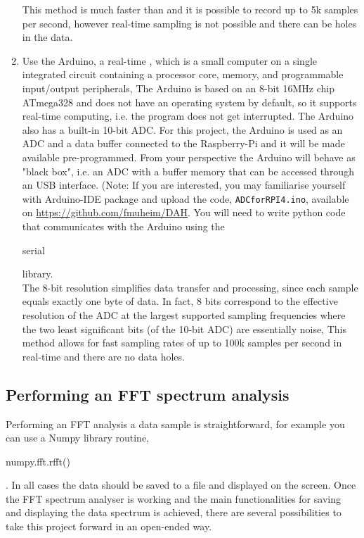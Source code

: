 \begin{enumerate}

 
This method is much faster than \webiopi  and it is possible to record up to 5k samples per second, however real-time sampling is not possible and there can be holes in the data.

\item	Use the Arduino, a real-time \microcontroller, which  is a small computer on a single integrated circuit containing a processor core, memory, and programmable input/output peripherals, 
The Arduino is based on an 8-bit 16MHz chip ATmega328 and does not have an operating system by default, so it supports real-time computing, i.e. the program does not get interrupted. The Arduino also has a built-in 10-bit ADC. For this project, the Arduino is used as an ADC and a data buffer connected to the Raspberry-Pi and it will be made available pre-programmed. From your perspective the Arduino will behave as "black box", i.e. an ADC with a buffer memory that can be accessed through an USB interface. (Note: If you are interested, you may familiarise yourself with Arduino-IDE package and upload the code, {\tt ADCforRPI4.ino},  available on  \url{https://github.com/fmuheim/DAH}. 
You will need to write python code that communicates with the Arduino using the \begin{tt}serial\end{tt} library.\\



 The 8-bit resolution simplifies data transfer and processing, since each sample equals exactly one byte of data. In fact, 8 bits correspond to the effective resolution of the ADC at the largest supported sampling frequencies where the two least significant bits (of the 10-bit ADC) are essentially noise,
This method allows for fast sampling rates of up to 100k samples per second in real-time and there are no data holes.
\end{enumerate}

\subsection{Performing an FFT spectrum analysis}

Performing an FFT analysis a data sample is straightforward, for example you can use a Numpy library routine, \begin{tt}numpy.fft.rfft()\end{tt}. In all cases the data should be saved to a file and displayed on the screen.  Once the FFT spectrum analyser is working and the main functionalities for saving and displaying the data spectrum is achieved, there are several possibilities to take this project forward in an open-ended way. 

